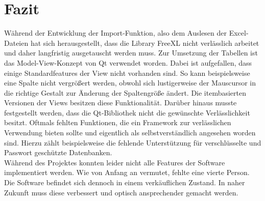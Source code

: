 \section{Fazit}
Während der Entwicklung der Import-Funktion, also dem Auslesen der Excel-Dateien hat sich herausgestellt, dass die Library FreeXL nicht verlässlich arbeitet und daher langfristig ausgetauscht werden muss. Zur Umsetzung der Tabellen ist das Model-View-Konzept von Qt verwendet worden. Dabei ist aufgefallen, dass einige Standardfeatures der View nicht vorhanden sind. So kann beispielsweise eine Spalte nicht vergrößert werden, obwohl sich lustigerweise der Mauscursor in die richtige Gestalt zur Änderung der Spaltengröße ändert. Die itembasierten Versionen der Views besitzen diese Funktionalität. Darüber hinaus musste festgestellt werden, dass die Qt-Bibliothek nicht die gewünschte Verlässlichkeit besitzt. Oftmals fehlten Funktionen, die ein Framework zur verlässlichen Verwendung bieten sollte und eigentlich als selbstverständlich angesehen worden sind. Hierzu zählt beispielsweise die fehlende Unterstützung für verschlüsselte und Passwort geschützte Datenbanken.\bigskip \\
Während des Projektes konnten leider nicht alle Features der Software implementiert werden. Wie von Anfang an vermutet, fehlte eine vierte Person. Die Software befindet sich dennoch in einem verkäuflichen Zustand. In naher Zukunft muss diese verbessert und optisch ansprechender gemacht werden.